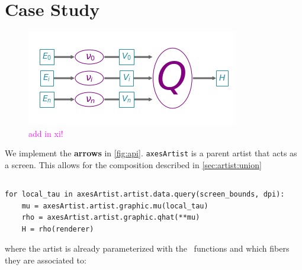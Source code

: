 \documentclass[10pt,journal,compsoc]{IEEEtran}
\newcommand{\note}[1]{\textcolor{magenta}{#1}}
\theoremstyle{definition}
\theoremstyle{remark}
\begin{document}
\section{Case Study}
\label{sec:case-study}
\begin{figure}[h!]
  \includegraphics[width=\columnwidth]{path_of_q.png}
    \caption{\note{add in xi!}}
  \label{fig:api}
\end{figure}
We implement the \textbf{arrows} in \autoref{fig:api}. \texttt{axesArtist} is a parent artist that acts as a screen. This allows for the composition described in                                           \autoref{sec:artist:union}

\subsection{\vartist}
\begin{verbatim}
for local_tau in axesArtist.artist.data.query(screen_bounds, dpi):
    mu = axesArtist.artist.graphic.mu(local_tau)
    rho = axesArtist.artist.graphic.qhat(**mu)
    H = rho(renderer)
\end{verbatim}

where the artist is already parameterized with the \vindex\ functions and which fibers they are associated to:

\begin{verbatim}
\end{verbatim}


\subsubsection{\vindex}
\subsubsection{\vchannel}
\subsubsection{\vmarkd}
\end{document}
